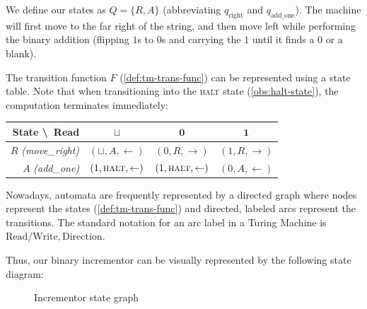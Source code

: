 We define our states as \(Q = \{R, A\}\) (abbreviating \(q_{\text{right}}\) and \(q_{\text{add\_one}}\)). The machine will first move to the far right of the string, and then move left while performing the binary addition (flipping \(1\)s to \(0\)s and carrying the \(1\) until it finds a \(0\) or a blank).

The transition function \(F\) (\cref{def:tm-trans-func}) can be represented using a state table. Note that when transitioning into the \textsc{halt} state (\cref{obs:halt-state}), the computation terminates immediately:

\begin{center}
    \renewcommand{\arraystretch}{1.5}
    \begin{tabular}{r | c c c}
        \textbf{State \textbackslash\ Read} & \(\sqcup\)& \(\mathbf{0}\) & \(\mathbf{1}\) \\
        \hline
        \(R\) \textit{(move\_right)} & \((\sqcup, A, \leftarrow)\) & \((0, R, \rightarrow)\) & \((1, R, \rightarrow)\) \\
        \(A\) \textit{(add\_one)} & \((1, \textsc{halt}, \leftarrow)\) & \((1, \textsc{halt}, \leftarrow)\) & \((0, A, \leftarrow)\) \\
    \end{tabular}
\end{center}

\noindent Nowadays, automata are frequently represented by a directed graph where nodes represent the states (\cref{def:tm-trans-func}) and directed, labeled arcs represent the transitions. The standard notation for an arc label in a Turing Machine is \(\text{Read} / \text{Write}, \text{Direction}\). 

Thus, our binary incrementor can be visually represented by the following state diagram:

\begin{figure}[H]
    \centering
    \caption{Incrementor state graph}
    \label{fig:incrementor-graph}
\end{figure}

